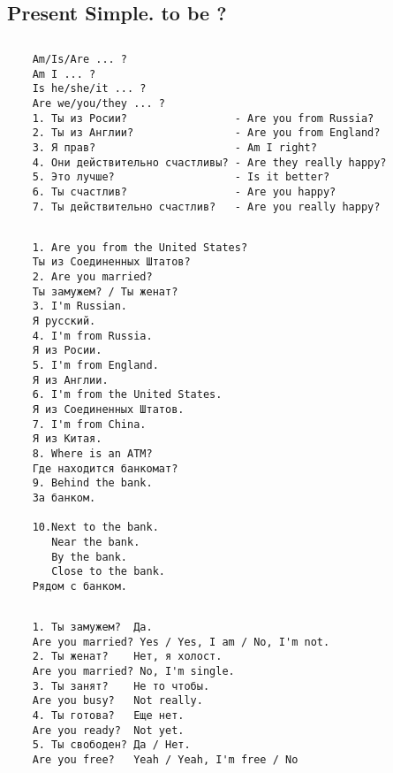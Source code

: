 \subsection{Present Simple. to be ?}
\subsection*{}
\begin{verbatim}
    Am/Is/Are ... ?
    Am I ... ?
    Is he/she/it ... ?
    Are we/you/they ... ?
    1. Ты из Росии?                 - Are you from Russia?
    2. Ты из Англии?                - Are you from England?
    3. Я прав?                      - Am I right?
    4. Они действительно счастливы? - Are they really happy?
    5. Это лучше?                   - Is it better?
    6. Ты счастлив?                 - Are you happy?
    7. Ты действительно счастлив?   - Are you really happy?
\end{verbatim}

\subsection*{}
\begin{verbatim}
    1. Are you from the United States?
    Ты из Соединенных Штатов?
    2. Are you married?
    Ты замужем? / Ты женат?
    3. I'm Russian.
    Я русский.
    4. I'm from Russia.
    Я из Росии.
    5. I'm from England.
    Я из Англии.
    6. I'm from the United States.
    Я из Соединенных Штатов.
    7. I'm from China.
    Я из Китая.
    8. Where is an ATM?
    Где находится банкомат?
    9. Behind the bank.
    За банком.

    10.Next to the bank.
       Near the bank.
       By the bank.
       Close to the bank.
    Рядом с банком.
\end{verbatim}

\subsection*{}
\begin{verbatim}
    1. Ты замужем?  Да.
    Are you married? Yes / Yes, I am / No, I'm not.
    2. Ты женат?    Нет, я холост.
    Are you married? No, I'm single.
    3. Ты занят?    Не то чтобы.
    Are you busy?   Not really.
    4. Ты готова?   Еще нет.
    Are you ready?  Not yet.
    5. Ты свободен? Да / Нет.
    Are you free?   Yeah / Yeah, I'm free / No
\end{verbatim}

